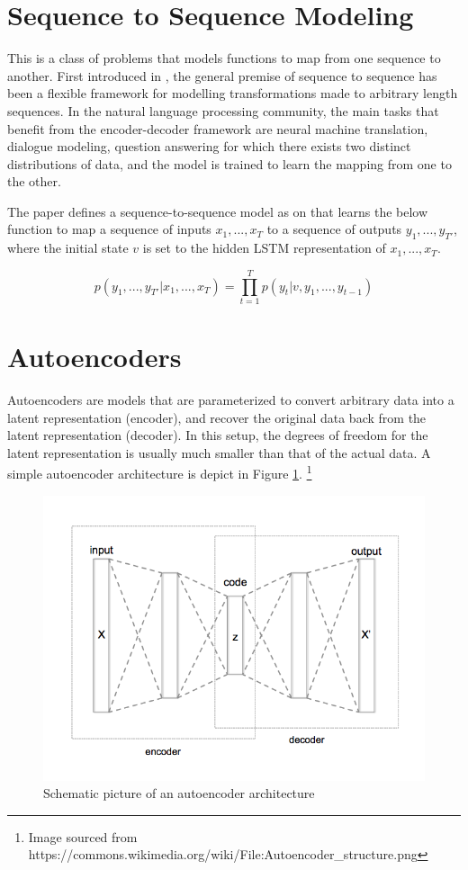 \section{Sequence to Sequence Modeling}

This is a class of problems that models functions to map from one sequence to another. First introduced in \citep{sutskever2014sequence}, the general premise of sequence to sequence has been a flexible framework for modelling transformations made to arbitrary length sequences. In the natural language processing community, the main tasks that benefit from the encoder-decoder framework are neural machine translation, dialogue modeling, question answering for which there exists two distinct distributions of data, and the model is trained to learn the mapping from one to the other.

The paper defines a sequence-to-sequence model as on that learns the below function to map a sequence of inputs $x_1, ... , x_T$ to a sequence of outputs $y_1, ... , y_{T′}$, where the initial state $v$ is set to the hidden LSTM representation of $x_1, ... , x_T$.

\begin{equation}
	p(y_1, ... , y_{T′} | x_1, ... , x_T) =	\prod_{t=1}^T p(y_t | v, y_1, ... , y_{t−1})
\end{equation}


\section{Autoencoders}

Autoencoders are models that are parameterized to convert arbitrary data into a latent representation (encoder), and recover the original data back from the latent representation (decoder). In this setup, the degrees of freedom for the latent representation is usually much smaller than that of the actual data. A simple autoencoder architecture is depict in Figure \ref{fig:autoencoder-structure}. \footnote{Image sourced from https://commons.wikimedia.org/wiki/File:Autoencoder\_structure.png}

\begin{figure}[ht]
	\centering
	\includegraphics[width=.8\textwidth]{images/autoencoder-structure}
	\caption{\label{fig:autoencoder-structure} Schematic picture of an autoencoder architecture}
\end{figure}

